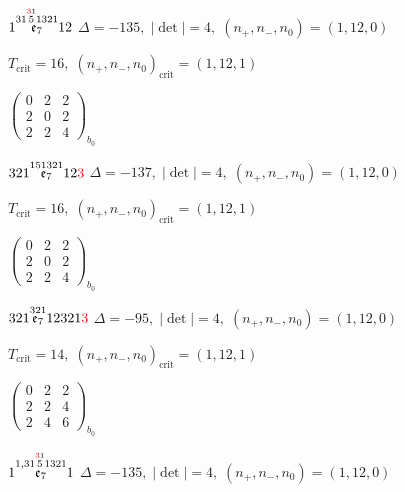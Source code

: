 \documentclass[10pt]{article}
\begin{document}
\smallskip

$1\overset{31\overset{\textcolor{red}{3}1}{5}1321}{\mathfrak{e}_7}12$ \quad $\Delta=-135,\; |\det|=4,\; (n_+,n_-,n_0)=(1,12,0)$

\hspace{1em}$T_{\text{crit}}=16,\; (n_+,n_-,n_0)_{\text{crit}}=(1,12,1)$

\hspace{2em}$\left(\begin{smallmatrix}0 & 2 & 2 \\ 2 & 0 & 2 \\ 2 & 2 & 4\end{smallmatrix}\right)_{\!b_0}$

\smallskip

$321\overset{151321}{\mathfrak{e}_7}12\textcolor{red}{3}$ \quad $\Delta=-137,\; |\det|=4,\; (n_+,n_-,n_0)=(1,12,0)$

\hspace{1em}$T_{\text{crit}}=16,\; (n_+,n_-,n_0)_{\text{crit}}=(1,12,1)$

\hspace{2em}$\left(\begin{smallmatrix}0 & 2 & 2 \\ 2 & 0 & 2 \\ 2 & 2 & 4\end{smallmatrix}\right)_{\!b_0}$

\smallskip

$321\overset{321}{\mathfrak{e}_7}12321\textcolor{red}{3}$ \quad $\Delta=-95,\; |\det|=4,\; (n_+,n_-,n_0)=(1,12,0)$

\hspace{1em}$T_{\text{crit}}=14,\; (n_+,n_-,n_0)_{\text{crit}}=(1,12,1)$

\hspace{2em}$\left(\begin{smallmatrix}0 & 2 & 2 \\ 2 & 2 & 4 \\ 2 & 4 & 6\end{smallmatrix}\right)_{\!b_0}$

\smallskip

$1\overset{1,31\overset{\textcolor{red}{3}1}{5}1321}{\mathfrak{e}_7}1$ \quad $\Delta=-135,\; |\det|=4,\; (n_+,n_-,n_0)=(1,12,0)$
\end{document}
